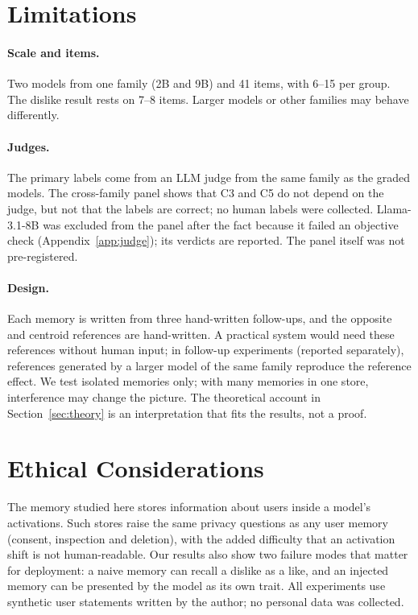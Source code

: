 \documentclass[11pt]{article}
\begin{document}
\section*{Limitations}
\label{sec:limits}

\paragraph{Scale and items.} Two models from one family (2B and 9B) and 41 items, with 6--15 per group. The dislike result rests on 7--8 items. Larger models or other families may behave differently.

\paragraph{Judges.} The primary labels come from an LLM judge from the same family as the graded models. The cross-family panel shows that C3 and C5 do not depend on the judge, but not that the labels are correct; no human labels were collected. Llama-3.1-8B was excluded from the panel after the fact because it failed an objective check (Appendix~\ref{app:judge}); its verdicts are reported. The panel itself was not pre-registered.

\paragraph{Design.} Each memory is written from three hand-written follow-ups, and the opposite and centroid references are hand-written. A practical system would need these references without human input; in follow-up experiments (reported separately), references generated by a larger model of the same family reproduce the reference effect. We test isolated memories only; with many memories in one store, interference may change the picture. The theoretical account in Section~\ref{sec:theory} is an interpretation that fits the results, not a proof.

\section*{Ethical Considerations}
The memory studied here stores information about users inside a model's activations. Such stores raise the same privacy questions as any user memory (consent, inspection and deletion), with the added difficulty that an activation shift is not human-readable. Our results also show two failure modes that matter for deployment: a naive memory can recall a dislike as a like, and an injected memory can be presented by the model as its own trait. All experiments use synthetic user statements written by the author; no personal data was collected.
\end{document}
